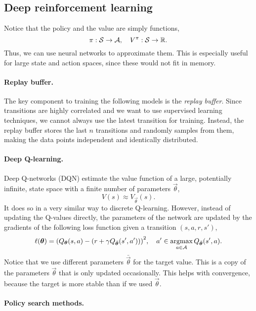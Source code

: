 \subsection{Deep reinforcement learning}

Notice that the policy and the value are simply functions, \[
    \pi: \mathcal{S} \to \mathcal{A}, \quad V^\pi: \mathcal{S} \to \mathbb{R}.
\]
Thus, we can use neural networks to approximate them. This is especially useful for large state and
action spaces, since these would not fit in memory.

\paragraph{Replay buffer.}

The key component to training the following models is the \textit{replay buffer}. Since transitions
are highly correlated and we want to use supervised learning techniques, we cannot always use the
latest transition for training. Instead, the replay buffer stores the last $n$ transitions and
randomly samples from them, making the data points independent and identically distributed.

\paragraph{Deep Q-learning.}

Deep Q-networks (DQN) estimate the value function of a large, potentially infinite, state space
with a finite number of parameters $\vec{\theta}$, \[
    V(s) \approx V_{\vec{\theta}}(s).
\]
It does so in a very similar way to discrete Q-learning. However, instead of updating the Q-values
directly, the parameters of the network are updated by the gradients of the following loss function
given a transition $(s, a, r, s')$, \[
    \ell(\vec{\theta}) = \lft( Q_{\vec{\theta}}(s, a) - (r + \gamma Q_{\bar{\vec{\theta}}}(s',a')) \rgt)^2, \quad a' \in \argmax_{a \in \mathcal{A}} Q_{\bar{\vec{\theta}}}(s', a).
\]
Notice that we use different parameters $\bar{\vec{\theta}}$ for the target value. This is a copy
of the parameters $\vec{\theta}$ that is only updated occasionally. This helps with convergence,
because the target is more stable than if we used $\vec{\theta}$.

\paragraph{Policy search methods.}

